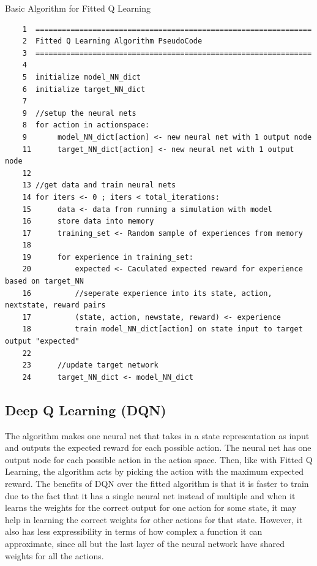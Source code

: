 \documentclass[onecolumn,letterpaper,11pt]{article}
\begin{document}
\vspace{0.15in}
\begin{listing}{Basic Algorithm for Fitted Q Learning}
	\label{basic_fitted_alg}
	\footnotesize
	\begin{verbatim}
	1  =============================================================== 
	2  Fitted Q Learning Algorithm PseudoCode                   
	3  =============================================================== 
	4                                                                  
	5  initialize model_NN_dict
	6  initialize target_NN_dict
	7  
	9  //setup the neural nets
	8  for action in actionspace:
	9       model_NN_dict[action] <- new neural net with 1 output node
	11      target_NN_dict[action] <- new neural net with 1 output node
	12	
	13 //get data and train neural nets
	14 for iters <- 0 ; iters < total_iterations:
	15      data <- data from running a simulation with model 
	16      store data into memory
	17      training_set <- Random sample of experiences from memory
	18
	19      for experience in training_set: 
	20          expected <- Caculated expected reward for experience based on target_NN
	16          //seperate experience into its state, action, nextstate, reward pairs
	17          (state, action, newstate, reward) <- experience
	18          train model_NN_dict[action] on state input to target output "expected"
	22 
	23      //update target network
	24      target_NN_dict <- model_NN_dict

	\end{verbatim}
	\normalsize
\end{listing}


\subsection{Deep Q Learning (DQN)}
The algorithm makes one neural net that takes in a state representation as input and outputs the expected reward for each possible action. The neural net has one output node for each possible action in the action space. Then, like with Fitted Q Learning, the algorithm acts by picking the action with the maximum expected reward. The benefits of DQN over the fitted algorithm is that it is faster to train due to the fact that it has a single neural net instead of multiple and when it learns the weights for the correct output for one action for some state, it may help in learning the correct weights for other actions for that state. However, it also has less expressibility in terms of how complex a function it can approximate, since all but the last layer of the neural network have shared weights for all the actions.
\end{document}
